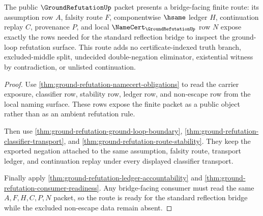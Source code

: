 \begin{theorem}
\label{thm:ground-refutation-bridge-facing-route}
The public $\GroundRefutationUp$ packet presents a bridge-facing finite route: its assumption row $A$, falsity route $F$, componentwise $\hsame$ ledger $H$, continuation replay $C$, provenance $P$, and local $\NameCert_{\GroundRefutationUp}$ row $N$ expose exactly the rows needed for the standard reflection bridge to inspect the ground-loop refutation surface. This route adds no certificate-indexed truth branch, excluded-middle split, undecided double-negation eliminator, existential witness by contradiction, or unlisted continuation.
\end{theorem}
\begin{proof}
Use \autoref{thm:ground-refutation-namecert-obligations} to read the carrier exposure, classifier row, stability row, ledger row, and non-escape row from the local naming surface. These rows expose the finite packet as a public object rather than as an ambient refutation rule.

Then use \autoref{thm:ground-refutation-ground-loop-boundary}, \autoref{thm:ground-refutation-classifier-transport}, and \autoref{thm:ground-refutation-route-stability}. They keep the exported negation attached to the same assumption, falsity route, transport ledger, and continuation replay under every displayed classifier transport.

Finally apply \autoref{thm:ground-refutation-ledger-accountability} and \autoref{thm:ground-refutation-consumer-readiness}. Any bridge-facing consumer must read the same $A,F,H,C,P,N$ packet, so the route is ready for the standard reflection bridge while the excluded non-escape data remain absent.
\end{proof}


